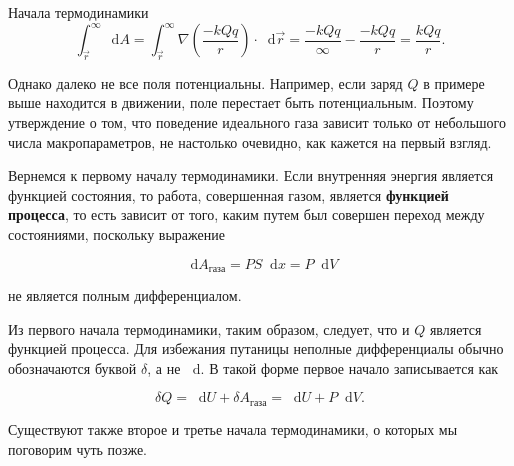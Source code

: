 \documentclass{article}
\renewcommand{\d}{\mathop{}\!\mathrm{d}}
\begin{document}
\begin{section}{Начала термодинамики}
		\begin{equation*}
			\int_{\vec{r}}^{\infty} \d A = \int_{\vec{r}}^{\infty} \nabla \left( \frac{-kQq}{r} \right) \cdot \d \vec{r} = \frac{-kQq}{\infty} - \frac{-kQq}{r} = \frac{kQq}{r}.
		\end{equation*}

		Однако далеко не все поля потенциальны. Например, если заряд $Q$ в примере выше находится в движении, поле перестает быть потенциальным. Поэтому утверждение о том, что поведение идеального газа зависит только от небольшого числа макропараметров, не настолько очевидно, как кажется на первый взгляд.

		Вернемся к первому началу термодинамики. Если внутренняя энергия является функцией состояния, то работа, совершенная газом, является \textbf{функцией процесса}, то есть зависит от того, каким путем был совершен переход между состояниями, поскольку выражение

		\begin{equation*}
			\d A_{\text{газа}} = PS \d x = P \d V
		\end{equation*}

		не является полным дифференциалом.

		Из первого начала термодинамики, таким образом, следует, что и $Q$ является функцией процесса. Для избежания путаницы неполные дифференциалы обычно обозначаются буквой $\delta$, а не $\d$. В такой форме первое начало записывается как

		\begin{equation*}
			\delta Q = \d U + \delta A_{\text{газа}} = \d U + P \d V.
		\end{equation*}

		Существуют также второе и третье начала термодинамики, о которых мы поговорим чуть позже.
	\end{section}
\end{document}
